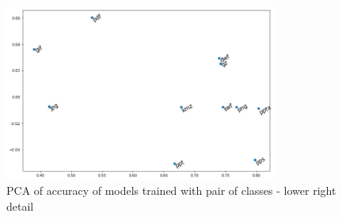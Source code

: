\noindent
\begin{figure}[htb!]
\centering\includegraphics[width=0.8\textwidth]{content/pca2.png}
\caption{\label{fig:pca2}PCA of accuracy of models trained with pair of classes - lower right detail}%
\end{figure}

